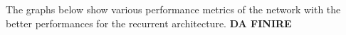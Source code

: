 The graphs below show various performance metrics of the network with the better
performances for the recurrent architecture. \textbf{DA FINIRE}

